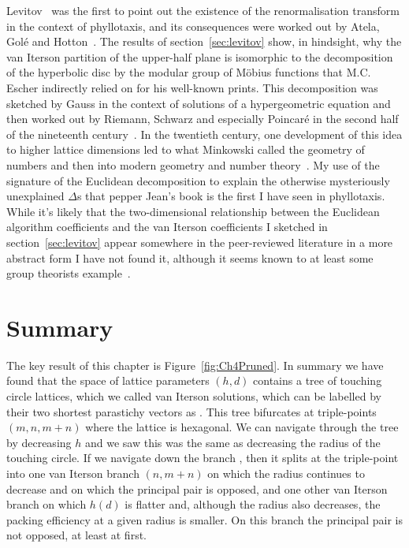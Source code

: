 Levitov~\cite{levitovFibonacciNumbersBotany1991} was the first to point out the existence of the renormalisation transform in the context of phyllotaxis, and its consequences were worked out by Atela, Golé and Hotton~\autocite{atelaDynamicalSystemPlant2002}. 
 The results of section~\ref{sec:levitov} show, in hindsight, why the van Iterson partition of the upper-half plane is isomorphic to the decomposition of the hyperbolic disc by the modular group of M{\"o}bius functions that M.C. Escher indirectly relied on for his well-known prints. This decomposition was sketched by Gauss in the context of solutions of a hypergeometric equation and then worked out by Riemann,  Schwarz and especially Poincar\'{e} in the second half of the nineteenth century~\cite{gaussBemerkungFragmentenUber2011,poincarePapersFuchsianFunctions1985,schwarzUeberDiejenigenFalle1873,johnstillwellTranslatorNotePoincare1996}. 
  In the twentieth century, one development of this idea to higher lattice dimensions led to what Minkowski called the geometry of numbers and then into modern geometry and number theory~\cite{bergerGeometryRevealedJacob2010}.
My use of the signature of the Euclidean decomposition to explain the otherwise mysteriously unexplained $\Delta$s that pepper Jean's book is the first I have seen in phyllotaxis.   While it's likely that the  two-dimensional relationship between the Euclidean algorithm coefficients and the van Iterson coefficients I sketched in section~\ref{sec:levitov} appear somewhere in the peer-reviewed literature in a more abstract form I have not found it, although it seems known to at least some group theorists example~\cite{conradIdealClassesSL22024}.  
 

\section{Summary}
\label{sec:ClassifyingSummary}
The key result of this chapter is Figure~\ref{fig:Ch4Pruned}. In summary we have found that the space of lattice parameters $(h,d)$ contains a tree of touching circle lattices, which we called van Iterson solutions, which can be  labelled by their two shortest parastichy vectors as . This tree bifurcates at triple-points $(m,n,m+n)$ where the lattice is hexagonal. We can navigate through the tree by decreasing $h$ and we saw this was the same as decreasing the radius of the touching circle. If we navigate down the branch , then it splits at the triple-point
into one van Iterson branch $(n,m+n)$ on which the radius continues to decrease and on which the principal pair is opposed, and one other van Iterson branch on which  $h(d)$ is flatter and, although the radius also decreases, the packing efficiency at a given radius is smaller. On this branch the principal pair is not opposed, at least at first. 


